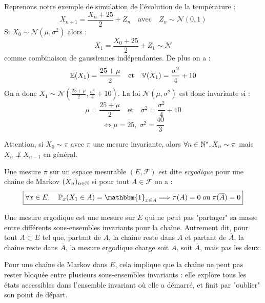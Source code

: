 \begin{example}
    Reprenons notre exemple de simulation de l'évolution de la température : 
        $$ X_{n+1} = \frac{X_n + 25}{2} + Z_n \quad \text{avec} \quad Z_n \sim \mathcal{N}(0,1) $$ 
    Si $X_0 \sim \mathcal{N}( \mu, \sigma^2)$ alors : 
        $$ X_1 = \frac{X_0 + 25}{2} + Z_1 \sim \mathcal{N} $$
    comme combinaison de gaussiennes indépendantes. De plus on a : 
        $$ \mathbb{E}(X_1) = \frac{25 + \mu}{2} \quad \text{et} \quad \mathbb{V}(X_1) = \frac{ \sigma^2}{4} + 10 $$    
    On a donc $ X_1 \sim \mathcal{N} \left(\frac{25 + \mu}{2}, \frac{ \sigma^2}{4} + 10\right)$. 
    La loi $ \mathcal{N}( \mu, \sigma^2)$ est donc invariante si : 
        $$ \mu = \frac{25 + \mu}{2} \quad \text{et} \quad \sigma^2 = \frac{ \sigma^2}{4} + 10 $$ 
        $$ \iff \mu = 25, \; \sigma^2 = \frac{40}{3} $$   
\end{example}

\begin{remark}
    Attention, si $X_0 \sim \pi$ avec $ \pi$ une mesure invariante, alors $ \forall n \in \mathbb{N}^*, X_n \sim \pi$ 
    mais $ X_n \not \perp X_{n-1}$ en général. 
\end{remark}

\begin{definition}
    Une mesure $ \pi$ sur un espace mesurable $(E, \mathcal{F})$ est dite \emph{ergodique} pour une chaîne de Markov 
    $(X_n)_{n \in \mathbb{N}}$ si pour tout $A \in \mathcal{F}$ on a : 
        $$ \boxed{\forall x \in E, \quad \myP_x(X_1 \in A) = \mathbbm{1}_{x \in A} \Longrightarrow \pi(A) = 0 \; \text{ou} \; \pi(\overline{A}) = 0 }$$      
\end{definition}

Une mesure ergodique est une mesure sur $E$ qui ne peut pas "partager" sa masse entre différents sous-ensembles 
invariants pour la chaîne. Autrement dit, pour tout $A \subset E$ tel que, partant de $A$, la chaîne reste dans 
$A$ et partant de $\overline{A}$, la chaîne reste dans $\overline{A}$, la mesure ergodique charge soit 
$A$, soit $\overline{A}$, mais pas les deux.

Pour une chaîne de Markov dans $E$, cela implique que la chaîne ne peut pas rester bloquée entre plusieurs 
sous-ensembles invariants : elle explore tous les états accessibles dans l’ensemble invariant où elle a démarré, 
et finit par "oublier" son point de départ.

